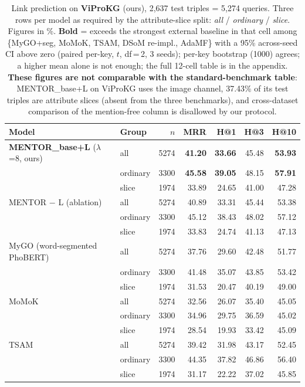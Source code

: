 \begin{table}[t]
\centering
\footnotesize
\caption{Link prediction on \textbf{ViProKG} (ours), 2{,}637 test triples = 5{,}274 queries. Three rows per model as required by the attribute-slice split: \emph{all} / \emph{ordinary} / \emph{slice}. Figures in \%. \textbf{Bold} = exceeds the strongest external baseline in that cell among \{MyGO+seg, MoMoK, TSAM, DSoM re-impl., AdaMF\} with a 95\% across-seed CI above zero (paired per-key, $t$, df\,=\,2, 3 seeds); per-key bootstrap (1000) agrees; a higher mean alone is not enough; the full 12-cell table is in the appendix. \textbf{These figures are not comparable with the standard-benchmark table}: MENTOR\_base+L on ViProKG uses the image channel, 37.43\% of its test triples are attribute slices (absent from the three benchmarks), and cross-dataset comparison of the mention-free column is disallowed by our protocol.}
\label{tab:viprokg}
\begin{tabular}{l l r r r r r}
\toprule
Model & Group & $n$ & MRR & H@1 & H@3 & H@10 \\
\midrule
\textbf{MENTOR\_base+L} ($\lambda$=8, ours) & all & 5274 & \textbf{41.20} & \textbf{33.66} & 45.48 & \textbf{53.93} \\
 & ordinary & 3300 & \textbf{45.58} & \textbf{39.05} & 48.15 & \textbf{57.91} \\
 & slice & 1974 & 33.89 & 24.65 & 41.00 & 47.28 \\
\midrule
MENTOR $-$ L (ablation) & all & 5274 & 40.89 & 33.31 & 45.44 & 53.38 \\
 & ordinary & 3300 & 45.12 & 38.43 & 48.02 & 57.12 \\
 & slice & 1974 & 33.83 & 24.74 & 41.13 & 47.13 \\
\midrule
MyGO (word-segmented PhoBERT) & all & 5274 & 37.76 & 29.60 & 42.48 & 51.77 \\
 & ordinary & 3300 & 41.48 & 35.07 & 43.85 & 53.42 \\
 & slice & 1974 & 31.53 & 20.47 & 40.19 & 49.00 \\
\midrule
MoMoK & all & 5274 & 32.56 & 26.07 & 35.40 & 45.05 \\
 & ordinary & 3300 & 34.96 & 29.75 & 36.59 & 45.02 \\
 & slice & 1974 & 28.54 & 19.93 & 33.42 & 45.09 \\
\midrule
TSAM & all & 5274 & 39.42 & 31.98 & 43.17 & 52.45 \\
 & ordinary & 3300 & 44.35 & 37.82 & 46.86 & 56.40 \\
 & slice & 1974 & 31.17 & 22.22 & 37.02 & 45.85 \\

\end{tabular}
\end{table}
